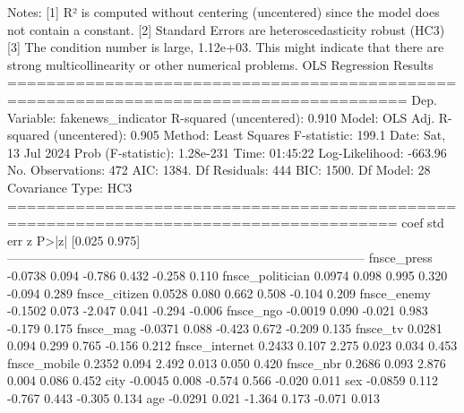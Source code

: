Notes:
[1] R² is computed without centering (uncentered) since the model does not contain a constant.
[2] Standard Errors are heteroscedasticity robust (HC3)
[3] The condition number is large, 1.12e+03. This might indicate that there are
strong multicollinearity or other numerical problems.                                 OLS Regression Results                                
=======================================================================================
Dep. Variable:     fakenews_indicator   R-squared (uncentered):                   0.910
Model:                            OLS   Adj. R-squared (uncentered):              0.905
Method:                 Least Squares   F-statistic:                              199.1
Date:                Sat, 13 Jul 2024   Prob (F-statistic):                   1.28e-231
Time:                        01:45:22   Log-Likelihood:                         -663.96
No. Observations:                 472   AIC:                                      1384.
Df Residuals:                     444   BIC:                                      1500.
Df Model:                          28                                                  
Covariance Type:                  HC3                                                  
======================================================================================
                         coef    std err          z      P>|z|      [0.025      0.975]
--------------------------------------------------------------------------------------
fnsce_press           -0.0738      0.094     -0.786      0.432      -0.258       0.110
fnsce_politician       0.0974      0.098      0.995      0.320      -0.094       0.289
fnsce_citizen          0.0528      0.080      0.662      0.508      -0.104       0.209
fnsce_enemy           -0.1502      0.073     -2.047      0.041      -0.294      -0.006
fnsce_ngo             -0.0019      0.090     -0.021      0.983      -0.179       0.175
fnsce_mag             -0.0371      0.088     -0.423      0.672      -0.209       0.135
fnsce_tv               0.0281      0.094      0.299      0.765      -0.156       0.212
fnsce_internet         0.2433      0.107      2.275      0.023       0.034       0.453
fnsce_mobile           0.2352      0.094      2.492      0.013       0.050       0.420
fnsce_nbr              0.2686      0.093      2.876      0.004       0.086       0.452
city                  -0.0045      0.008     -0.574      0.566      -0.020       0.011
sex                   -0.0859      0.112     -0.767      0.443      -0.305       0.134
age                   -0.0291      0.021     -1.364      0.173      -0.071       0.013
